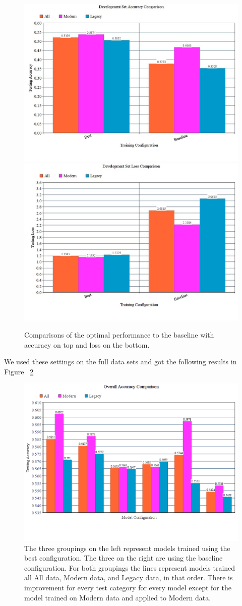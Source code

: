 \documentclass[letterpaper]{article} %
\begin{document}
\begin{figure}
  \includegraphics[width=.5\textwidth]{best-accuracy}
  \includegraphics[width=.5\textwidth]{best-loss}
  \caption{Comparisons of the optimal performance to the baseline with accuracy on top and loss on the bottom.}
  \label{fig:best}
\end{figure}

We used these settings on the full data sets and got the following results in Figure ~\ref{fig:bestoverall}

\begin{figure}
  \includegraphics[width=.5\textwidth]{best-overall}
  \caption{The three groupings on the left represent models trained using the best configuration.
  The three on the right are using the baseline configuration. For both groupings the lines represent
  models trained all All data, Modern data, and Legacy data, in that order. There is improvement
  for every test category for every model except for the model trained on Modern data and applied to Modern data.}
  \label{fig:bestoverall}
\end{figure}
\end{document}
